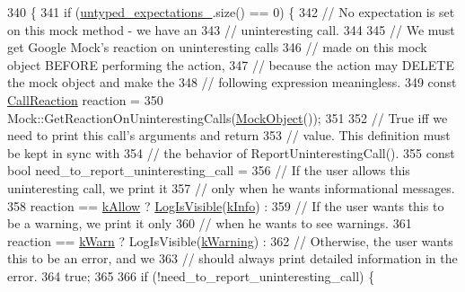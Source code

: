 \begin{DoxyCode}
340                                         \{
341   \textcolor{keywordflow}{if} (\hyperlink{classtesting_1_1internal_1_1UntypedFunctionMockerBase_aae4a42a4bace1fcb0cd4bdf1ddd40277}{untyped\_expectations\_}.size() == 0) \{
342     \textcolor{comment}{// No expectation is set on this mock method - we have an}
343     \textcolor{comment}{// uninteresting call.}
344 
345     \textcolor{comment}{// We must get Google Mock's reaction on uninteresting calls}
346     \textcolor{comment}{// made on this mock object BEFORE performing the action,}
347     \textcolor{comment}{// because the action may DELETE the mock object and make the}
348     \textcolor{comment}{// following expression meaningless.}
349     \textcolor{keyword}{const} \hyperlink{namespacetesting_1_1internal_adfcd859062983a889f4bd18e6977357e}{CallReaction} reaction =
350         Mock::GetReactionOnUninterestingCalls(\hyperlink{classtesting_1_1internal_1_1UntypedFunctionMockerBase_a71863dd67193a7082078d5b366d5ce51}{MockObject}());
351 
352     \textcolor{comment}{// True iff we need to print this call's arguments and return}
353     \textcolor{comment}{// value.  This definition must be kept in sync with}
354     \textcolor{comment}{// the behavior of ReportUninterestingCall().}
355     \textcolor{keyword}{const} \textcolor{keywordtype}{bool} need\_to\_report\_uninteresting\_call =
356         \textcolor{comment}{// If the user allows this uninteresting call, we print it}
357         \textcolor{comment}{// only when he wants informational messages.}
358         reaction == \hyperlink{namespacetesting_1_1internal_adfcd859062983a889f4bd18e6977357ea8fb8a836a31364701cd5c07daa8638cb}{kAllow} ? \hyperlink{namespacetesting_1_1internal_a69ffdba5ee36743e88d8f89b79e566ff}{LogIsVisible}(\hyperlink{namespacetesting_1_1internal_a203d1a8a2147a53d12bbdae40d443914a396aacfaee2849eaab7c1de9773d624d}{kInfo}) :
359         \textcolor{comment}{// If the user wants this to be a warning, we print it only}
360         \textcolor{comment}{// when he wants to see warnings.}
361         reaction == \hyperlink{namespacetesting_1_1internal_adfcd859062983a889f4bd18e6977357ead61a9c681c751967e19f7abe4640d4a2}{kWarn} ? LogIsVisible(\hyperlink{namespacetesting_1_1internal_a203d1a8a2147a53d12bbdae40d443914a5beeeab1b0a3caabd0afb43356c1a271}{kWarning}) :
362         \textcolor{comment}{// Otherwise, the user wants this to be an error, and we}
363         \textcolor{comment}{// should always print detailed information in the error.}
364         true;
365 
366     \textcolor{keywordflow}{if} (!need\_to\_report\_uninteresting\_call) \{

\end{DoxyCode}
